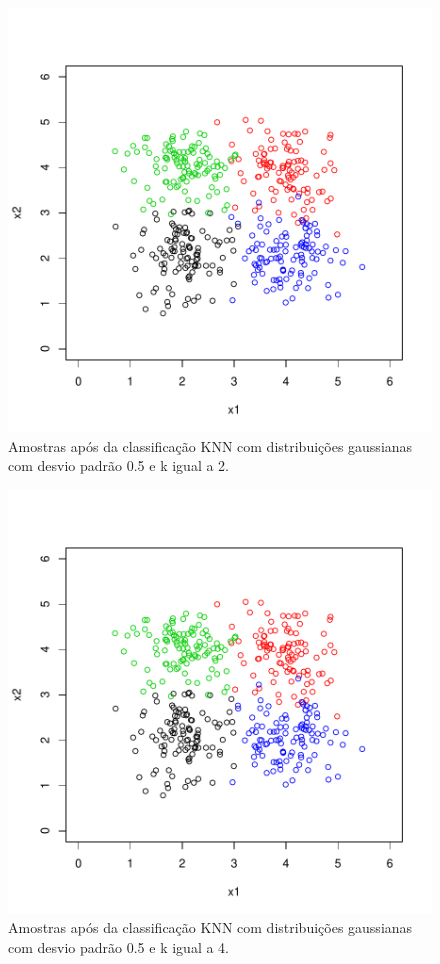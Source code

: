 \documentclass[12pt]{article}
\begin{document}
\begin{figure}[h]
\centering
\includegraphics{knn-013}
\caption{Amostras após da classificação KNN com distribuições gaussianas com desvio padrão 0.5 e k igual a 2.}
\label{sd_0.5}
\end{figure}

\begin{figure}[h]
\centering
\includegraphics{knn-014}
\caption{Amostras após da classificação KNN com distribuições gaussianas com desvio padrão 0.5 e k igual a 4.}
\label{sd_0.5}
\end{figure}
\end{document}
